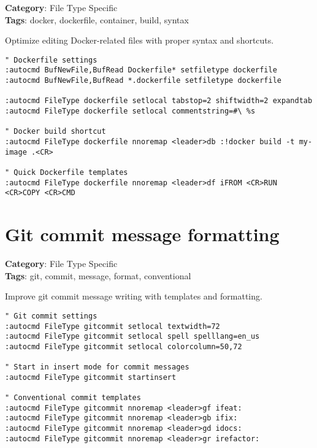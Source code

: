{{{{{{\textbf{Category}: File Type Specific\\ \textbf{Tags}: docker, dockerfile, container, build, syntax
\vspace{0.5cm}

Optimize editing Docker-related files with proper syntax and shortcuts.

\begin{Exa*}{}
\begin{Verbatim}[fontsize=\footnotesize, breaklines, breakanywhere]
" Dockerfile settings
:autocmd BufNewFile,BufRead Dockerfile* setfiletype dockerfile
:autocmd BufNewFile,BufRead *.dockerfile setfiletype dockerfile

:autocmd FileType dockerfile setlocal tabstop=2 shiftwidth=2 expandtab
:autocmd FileType dockerfile setlocal commentstring=#\ %s

" Docker build shortcut
:autocmd FileType dockerfile nnoremap <leader>db :!docker build -t my-image .<CR>

" Quick Dockerfile templates
:autocmd FileType dockerfile nnoremap <leader>df iFROM <CR>RUN <CR>COPY <CR>CMD 
\end{Verbatim}
\end{Exa*}

\section{Git commit message formatting}

\textbf{Category}: File Type Specific\\ \textbf{Tags}: git, commit, message, format, conventional
\vspace{0.5cm}

Improve git commit message writing with templates and formatting.

\begin{Exa*}{}
\begin{Verbatim}[fontsize=\footnotesize, breaklines, breakanywhere]
" Git commit settings
:autocmd FileType gitcommit setlocal textwidth=72
:autocmd FileType gitcommit setlocal spell spelllang=en_us
:autocmd FileType gitcommit setlocal colorcolumn=50,72

" Start in insert mode for commit messages
:autocmd FileType gitcommit startinsert

" Conventional commit templates
:autocmd FileType gitcommit nnoremap <leader>gf ifeat: 
:autocmd FileType gitcommit nnoremap <leader>gb ifix: 
:autocmd FileType gitcommit nnoremap <leader>gd idocs: 
:autocmd FileType gitcommit nnoremap <leader>gr irefactor: 
\end{Verbatim}
\end{Exa*}

}}}}}}
